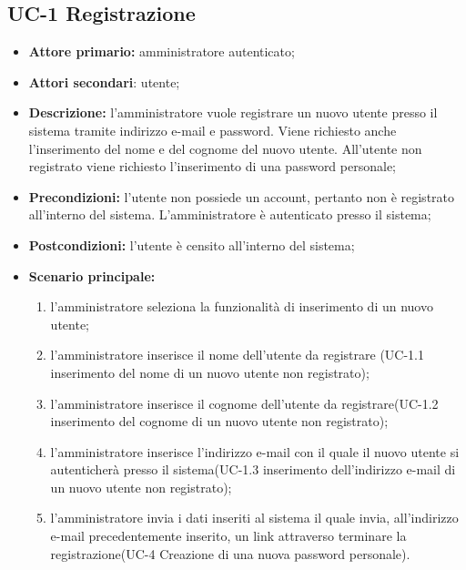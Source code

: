 
\subsection{UC-1 Registrazione}
\begin{itemize}
	\item \textbf{Attore primario:} amministratore autenticato;

	\item \textbf{Attori secondari}: utente;

	\item \textbf{Descrizione:} l'amministratore vuole registrare un nuovo utente presso il sistema tramite indirizzo e-mail e password. Viene richiesto anche l'inserimento del nome e del cognome del nuovo utente. All'utente non registrato viene richiesto l'inserimento di una password personale;

	\item \textbf{Precondizioni:} l'utente non possiede un account, pertanto non è registrato all'interno del sistema. L'amministratore è autenticato presso il sistema;
 
	\item \textbf{Postcondizioni:} l'utente è censito all'interno del sistema;

	\item \textbf{Scenario principale:}
	\begin{enumerate}
   		 \item l'amministratore seleziona la funzionalità di inserimento di un nuovo utente;
    	 \item l'amministratore inserisce il nome dell'utente da registrare (UC-1.1 inserimento del nome di un nuovo utente non registrato); 
    	 \item l'amministratore inserisce il cognome dell'utente da registrare(UC-1.2 inserimento del cognome di un nuovo utente non registrato); 
   	 	 \item l'amministratore inserisce l'indirizzo e-mail con il quale il nuovo utente si autenticherà presso il sistema(UC-1.3 inserimento dell'indirizzo e-mail di un nuovo utente non registrato);
    	 \item l'amministratore invia i dati inseriti al sistema il quale invia, all'indirizzo e-mail precedentemente inserito, un link attraverso terminare la registrazione(UC-4 Creazione di una nuova password personale).
	\end{enumerate}
\end{itemize}

